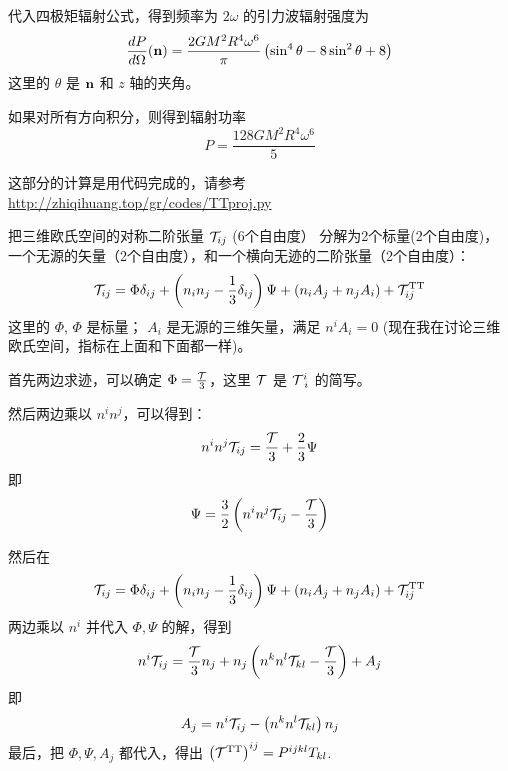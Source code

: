 \documentclass[CJK,13pt]{beamer}
\begin{document}
    \begin{frame}
      代入四极矩辐射公式，得到频率为 $2\omega$ 的引力波辐射强度为
      $$\frac{dP}{d\Omega} ({\mathbf{n}}) = \frac{2GM^2R^4 \omega^6}{\pi}\left(\sin^4\theta - 8\sin^2\theta + 8\right)$$
      这里的 $\theta$ 是 ${\mathbf{n}}$ 和 $z$ 轴的夹角。

      \skipline
      
      如果对所有方向积分，则得到辐射功率
      $$ P =  \frac{128 GM^2R^4 \omega^6}{5}$$

      这部分的计算是用代码完成的，请参考
      \url{http://zhiqihuang.top/gr/codes/TTproj.py}
    \end{frame}


    \begin{frame}

      把三维欧氏空间的对称二阶张量 $\mathcal{T}_{ij}$ (6个自由度） 分解为2个标量(2个自由度)，一个无源的矢量（2个自由度），和一个横向无迹的二阶张量（2个自由度）：
      $$\mathcal{T}_{ij} = \Phi\delta_{ij} + \left(n_in_j - \frac{1}{3}\delta_{ij}\right)\Psi + (n_iA_j + n_j A_i) + \mathcal{T}^{\rm TT}_{ij} $$
        这里的 $\Phi$, $\Phi$ 是标量； $A_i$ 是无源的三维矢量，满足 $n^iA_i=0$ (现在我在讨论三维欧氏空间，指标在上面和下面都一样)。

        首先两边求迹，可以确定 $\Phi = \frac{\mathcal{T}}{3}$，这里 $\mathcal{T}$ 是 $\mathcal{T}^i_{\ i}$ 的简写。

        然后两边乘以 $n^in^j$，可以得到：
        $$n^in^j\mathcal{T}_{ij} = \frac{\mathcal{T}}{3} + \frac{2}{3}\Psi $$
        即
        $$\Psi = \frac{3}{2}\left(n^in^j\mathcal{T}_{ij} - \frac{\mathcal{T}}{3}\right)$$
  \end{frame}


    \begin{frame}
      然后在
      $$\mathcal{T}_{ij} = \Phi\delta_{ij} + \left(n_in_j - \frac{1}{3}\delta_{ij}\right)\Psi + (n_iA_j + n_j A_i) + \mathcal{T}^{\rm TT}_{ij} $$
      两边乘以 $n^i$ 并代入 $\Phi, \Psi$ 的解，得到
      $$ n^i\mathcal{T}_{ij} = \frac{\mathcal{T}}{3}n_j +  n_j\left(n^kn^l\mathcal{T}_{kl} - \frac{\mathcal{T}}{3}\right) + A_j $$
      即
      $$ A_j =  n^i\mathcal{T}_{ij} -  \left(n^kn^l\mathcal{T}_{kl}\right)n_j $$
      最后，把 $\Phi, \Psi, A_j$ 都代入，得出 $ \left(\mathcal{T}^{\rm TT}\right)^{ij} = P^{ijkl}T_{kl}$.
    \end{frame}


    
    
    
  
    \ech
\end{document}
